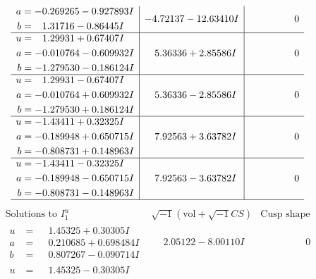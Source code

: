 \documentclass[1p]{elsarticle_modified}
\theoremstyle{definition}
\newcommand{\I}{\sqrt{-1}}
\begin{document}
$$\begin{array}{c|c|c}
\begin{aligned}
a &= -0.269265 - 0.927893 I \\
b &= \phantom{-}1.31716 - 0.86445 I\end{aligned}
 & -4.72137 - 12.63410 I & \phantom{-0.000000 } 0 \\ \hline\begin{aligned}
u &= \phantom{-}1.29931 + 0.67407 I \\
a &= -0.010764 - 0.609932 I \\
b &= -1.279530 - 0.186124 I\end{aligned}
 & \phantom{-}5.36336 + 2.85586 I & \phantom{-0.000000 } 0 \\ \hline\begin{aligned}
u &= \phantom{-}1.29931 - 0.67407 I \\
a &= -0.010764 + 0.609932 I \\
b &= -1.279530 + 0.186124 I\end{aligned}
 & \phantom{-}5.36336 - 2.85586 I & \phantom{-0.000000 } 0 \\ \hline\begin{aligned}
u &= -1.43411 + 0.32325 I \\
a &= -0.189948 + 0.650715 I \\
b &= -0.808731 + 0.148963 I\end{aligned}
 & \phantom{-}7.92563 + 3.63782 I & \phantom{-0.000000 } 0 \\ \hline\begin{aligned}
u &= -1.43411 - 0.32325 I \\
a &= -0.189948 - 0.650715 I \\
b &= -0.808731 - 0.148963 I\end{aligned}
 & \phantom{-}7.92563 - 3.63782 I & \phantom{-0.000000 } 0\\
 \hline 
 \end{array}$$\newpage$$\begin{array}{c|c|c}  
\text{Solutions to }I^u_{1}& \I (\text{vol} + \sqrt{-1}CS) & \text{Cusp shape}\\
 \hline 
\begin{aligned}
u &= \phantom{-}1.45325 + 0.30305 I \\
a &= \phantom{-}0.210685 + 0.698484 I \\
b &= \phantom{-}0.807267 - 0.090714 I\end{aligned}
 & \phantom{-}2.05122 - 8.00110 I & \phantom{-0.000000 } 0 \\ \hline\begin{aligned}
u &= \phantom{-}1.45325 - 0.30305 I \\

\end{aligned}
\end{array}$$
\end{document}
